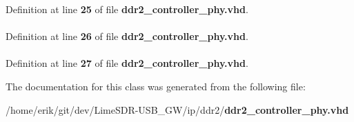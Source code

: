Definition at line {\bf 25} of file {\bf ddr2\+\_\+controller\+\_\+phy.\+vhd}.

\paragraph[{std\+\_\+logic\+\_\+arith}]{\hspace{0.3cm}{\ttfamily [Package]}}\label{classddr2__controller__phy_a0f5ecc6613f63d07f7963a97b1b26095}


Definition at line {\bf 26} of file {\bf ddr2\+\_\+controller\+\_\+phy.\+vhd}.

\paragraph[{std\+\_\+logic\+\_\+unsigned}]{\hspace{0.3cm}{\ttfamily [Package]}}\label{classddr2__controller__phy_a598da929e807d58939b47499e8bc9fa8}


Definition at line {\bf 27} of file {\bf ddr2\+\_\+controller\+\_\+phy.\+vhd}.



The documentation for this class was generated from the following file\+:\begin{DoxyCompactItemize}
\item 
/home/erik/git/dev/\+Lime\+S\+D\+R-\/\+U\+S\+B\+\_\+\+G\+W/ip/ddr2/{\bf ddr2\+\_\+controller\+\_\+phy.\+vhd}\end{DoxyCompactItemize}
